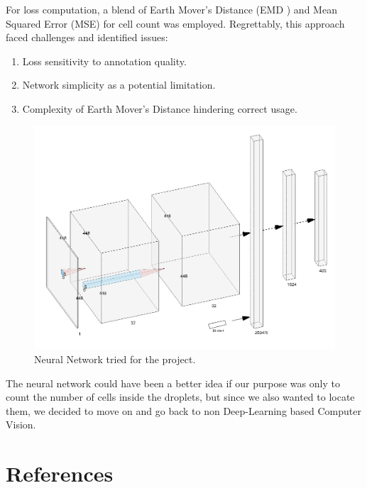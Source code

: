 \documentclass[12pt]{beamer}
\begin{document}
\begin{frame}[t]
\begin{multicols}{3}
\begin{multicols}{2}
For loss computation, a blend of Earth Mover's Distance (EMD \cite{emd}) and Mean Squared Error (MSE) for cell count was employed. Regrettably, this approach faced challenges and identified issues:
\begin{enumerate}
\item Loss sensitivity to annotation quality.
\item Network simplicity as a potential limitation.
\item Complexity of Earth Mover's Distance hindering correct usage.
\end{enumerate}
\vfill
\begin{center}
\begin{figure}
    \centering
    \includegraphics[width=\columnwidth]{figs/nn.png}   
    \caption{Neural Network tried for the project.}
    \label{fig:nn}
\end{figure}
\end{center}

The neural network could have been a better idea if our purpose was only to count the number of cells inside the droplets, but since we also wanted to locate them, we decided to move on and go back to non Deep-Learning based Computer Vision.
\end{multicols}


\section{References}

\nocite{Poster}

\printbibliography[heading=none]

\end{multicols}
\end{frame}
\end{document}
